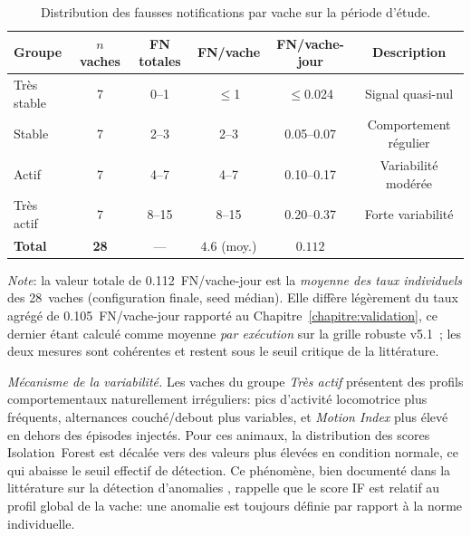 \begin{table}[H]
    \centering
    \small
    \caption{Distribution des fausses notifications par vache sur la période d'étude.}
    \label{tab:distribution_par_vache}
    \begin{tabular}{lccccc}
        \toprule
        \textbf{Groupe} & \textbf{$n$ vaches} & \textbf{FN totales} &
        \textbf{FN/vache} & \textbf{FN/vache-jour} & \textbf{Description} \\
        \midrule
        Très stable  & 7 & 0--1   & $\leq$1   & $\leq$0.024 & Signal quasi-nul \\
        Stable       & 7 & 2--3   & 2--3      & 0.05--0.07  & Comportement régulier \\
        Actif        & 7 & 4--7   & 4--7      & 0.10--0.17  & Variabilité modérée \\
        Très actif   & 7 & 8--15  & 8--15     & 0.20--0.37  & Forte variabilité \\
        \midrule
        \textbf{Total} & \textbf{28} & — & $\mathbf{4.6}$ (moy.) & $\mathbf{0.112}$ & \\
        \bottomrule
    \end{tabular}

    \vspace{0.3em}
    \raggedright\footnotesize\textit{Note}: la valeur totale de 0.112~FN/vache-jour est
    la \emph{moyenne des taux individuels} des 28~vaches (configuration finale, seed
    médian). Elle diffère légèrement du taux agrégé de 0.105~FN/vache-jour rapporté au
    Chapitre~\ref{chapitre:validation}, ce dernier étant calculé comme moyenne \emph{par
    exécution} sur la grille robuste v5.1~; les deux mesures sont cohérentes et restent
    sous le seuil critique de la littérature.
\end{table}

\textit{Mécanisme de la variabilité.}
Les vaches du groupe \textit{Très actif} présentent des profils comportementaux naturellement
irréguliers: pics d'activité locomotrice plus fréquents, alternances couché/debout plus
variables, et \textit{Motion Index} plus élevé en dehors des épisodes injectés. Pour ces animaux,
la distribution des scores Isolation~Forest est décalée vers des valeurs plus élevées en
condition normale, ce qui abaisse le seuil effectif de détection. Ce phénomène, bien
documenté dans la littérature sur la détection d'anomalies
\citep{chandola2009anomaly}, rappelle que le score IF est relatif au profil global de la
vache: une anomalie est toujours définie par rapport à la norme individuelle.

